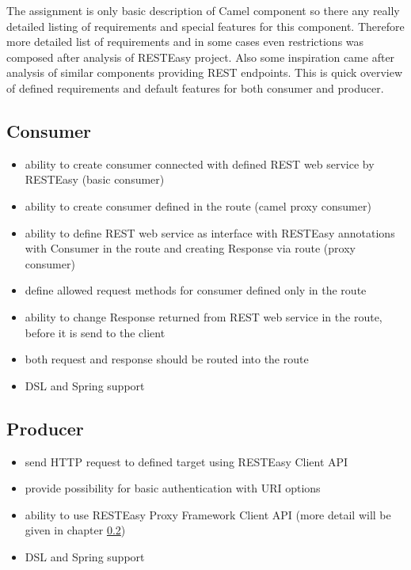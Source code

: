 \documentclass[12pt,final,oneside]{fithesis2}
\begin{document}
The assignment is only basic description of Camel component so there any really detailed listing of requirements and special features for this component. Therefore more detailed list of requirements and in some cases even restrictions was composed after analysis of RESTEasy project. Also some inspiration came after analysis of similar components providing REST endpoints. This is quick overview of defined requirements and default features for both consumer and producer.

\subsection{Consumer}
\begin{itemize}
\item
ability to create consumer connected with defined REST web service by RESTEasy (basic consumer)

\item
ability to create consumer defined in the route (camel proxy consumer)

\item
ability to define REST web service as interface with RESTEasy annotations with Consumer in the route and creating Response via route (proxy consumer)

\item
define allowed request methods for consumer defined only in the route


\item
ability to change Response returned from REST web service in the route, before it is send to the client 

\item
both request and response should be routed into the route

\item
DSL and Spring support


\end{itemize}

\subsection{Producer}
\begin{itemize}
\item
send HTTP request to defined target using RESTEasy Client API

\item
provide possibility for basic authentication with URI options

\item
ability to use RESTEasy Proxy Framework Client API (more detail will be given in chapter \ref{})

\item
DSL and Spring support
\end{itemize}
\end{document}
